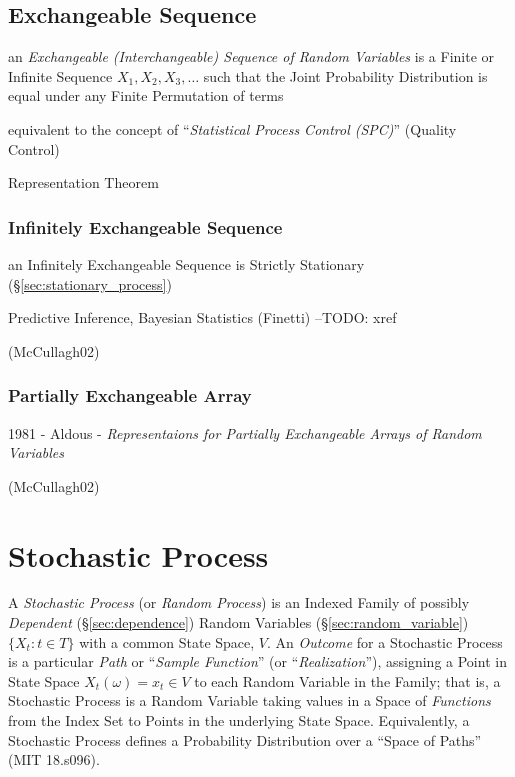 \subsection{Exchangeable Sequence}\label{sec:exchangeable_sequence}

an \emph{Exchangeable (Interchangeable) Sequence of Random Variables} is a
Finite or Infinite Sequence $X_1, X_2, X_3, \ldots$ such that the Joint
Probability Distribution is equal under any Finite Permutation of terms

equivalent to the concept of ``\emph{Statistical Process Control (SPC)}''
(Quality Control)

Representation Theorem



\subsubsection{Infinitely Exchangeable Sequence}
\label{sec:infinitely_exchangeable}

an Infinitely Exchangeable Sequence is Strictly Stationary
(\S\ref{sec:stationary_process})

Predictive Inference, Bayesian Statistics (Finetti) --TODO: xref

(McCullagh02)



\subsubsection{Partially Exchangeable Array}
\label{sec:partially_exchangeable}

1981 - Aldous -
\emph{Representaions for Partially Exchangeable Arrays of Random Variables}

(McCullagh02)



\section{Stochastic Process}\label{sec:stochastic_process}

A \emph{Stochastic Process} (or \emph{Random Process}) is an Indexed Family of
possibly \emph{Dependent} (\S\ref{sec:dependence}) Random Variables
(\S\ref{sec:random_variable}) $\{ X_t : t \in T \}$ with a common State Space,
$V$. An \emph{Outcome} for a Stochastic Process is a particular \emph{Path} or
``\emph{Sample Function}'' (or ``\emph{Realization}''), assigning a Point in
State Space $X_t(\omega) = x_t \in V$ to each Random Variable in the Family;
that is, a Stochastic Process is a Random Variable taking values in a Space of
\emph{Functions} from the Index Set to Points in the underlying State Space.
Equivalently, a Stochastic Process defines a Probability Distribution over a
``Space of Paths'' (MIT 18.s096).

